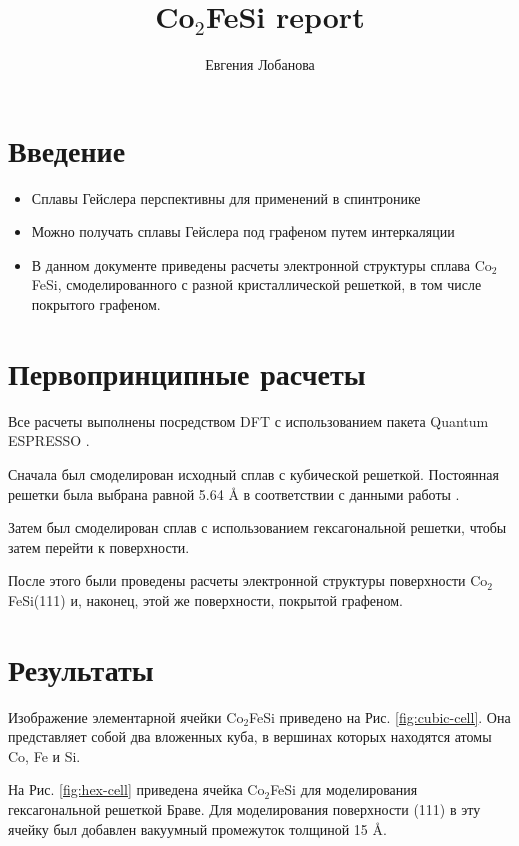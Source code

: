 \documentclass[]{article}
\title{Co$_2$FeSi report}
\author{Евгения Лобанова}
\begin{document}
\maketitle

\section{Введение}

\begin{itemize}
    \item Сплавы Гейслера перспективны для применений в спинтронике
    \item Можно получать сплавы Гейслера под графеном путем интеркаляции
    \item В данном документе приведены расчеты электронной структуры сплава Co$_2$FeSi, смоделированного с разной кристаллической решеткой, в том числе покрытого графеном.
\end{itemize}

\section{Первопринципные расчеты}

Все расчеты выполнены посредством DFT с использованием пакета Quantum ESPRESSO \cite{espresso}.

Сначала был смоделирован исходный сплав с кубической решеткой. Постоянная решетки была выбрана равной 5.64 Å в соответствии с данными работы \cite{doi:10.1063/1.2166205}.

Затем был смоделирован сплав с использованием гексагональной решетки, чтобы затем перейти к поверхности.

После этого были проведены расчеты электронной структуры поверхности Co$_2$FeSi(111) и, наконец, этой же поверхности, покрытой графеном.

\section{Результаты}

Изображение элементарной ячейки Co$_2$FeSi приведено на Рис. \ref{fig:cubic-cell}. Она представляет собой два вложенных куба, в вершинах которых находятся атомы Co, Fe и Si. 

На Рис. \ref{fig:hex-cell} приведена ячейка Co$_2$FeSi для моделирования гексагональной решеткой Браве. Для моделирования поверхности (111) в эту ячейку был добавлен вакуумный промежуток толщиной 15 Å.
\end{document}

